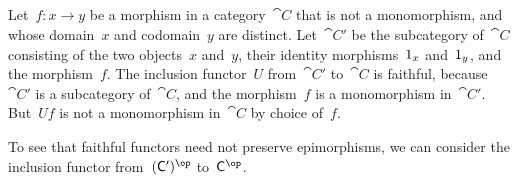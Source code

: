 \subsection{}

Let~$f \colon x \to y$ be a morphism in a category~$\cat{C}$ that is not a monomorphism, and whose domain~$x$ and codomain~$y$ are distinct.
Let~$\cat{C}'$ be the subcategory of~$\cat{C}$ consisting of the two objects~$x$ and~$y$, their identity morphisms~$1_x$ and~$1_y$, and the morphism~$f$.
The inclusion functor~$U$ from~$\cat{C}'$ to~$\cat{C}$ is faithful, because~$\cat{C}'$ is a subcategory of~$\cat{C}$, and the morphism~$f$ is a monomorphism in~$\cat{C}'$.
But~$U f$ is not a monomorphism in~$\cat{C}$ by choice of~$f$.

To see that faithful functors need not preserve epimorphisms, we can consider the inclusion functor from~$(\cat{C}')^{\op}$ to~$\cat{C}^{\op}$.
